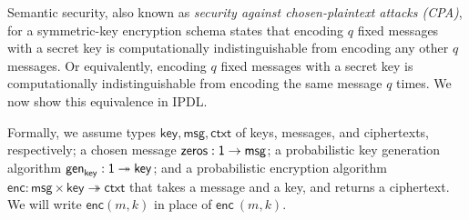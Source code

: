 \newcommand{\key}{\mathsf{key}}
\newcommand{\msg}{\mathsf{msg}}
\newcommand{\ctxt}{\mathsf{ctxt}}
\newcommand{\gen}{\mathsf{gen}}
\newcommand{\enc}{\mathsf{enc}}
\newcommand{\zeros}{\mathsf{zeros}}
\newcommand{\Msg}{\mathsf{Msg}}
\newcommand{\MsgL}{\mathsf{Msg}_L}
\newcommand{\MsgR}{\mathsf{Msg}_R}
\newcommand{\Key}{\mathsf{Key}}
\newcommand{\Enc}{\mathsf{Enc}}

Semantic security, also known as \emph{security against chosen-plaintext attacks (CPA)}, for a symmetric-key encryption schema states that encoding $q$ fixed messages with a secret key is computationally indistinguishable from encoding any other $q$ messages. Or equivalently, encoding $q$ fixed messages with a secret key is computationally indistinguishable from encoding the same message $q$ times. We now show this equivalence in \textsf{IPDL}.

Formally, we assume types $\key, \msg, \ctxt$ of keys, messages, and ciphertexts, respectively; a chosen message $\zeros : \one \rightarrow \msg$; a probabilistic key generation algorithm $\gen_\key : \one \twoheadrightarrow \key$; and a probabilistic encryption algorithm $\enc : \msg \times \key \twoheadrightarrow \ctxt$ that takes a message and a key, and returns a ciphertext. We will write $\enc(m,k)$ in place of $\enc \ (m,k)$.

